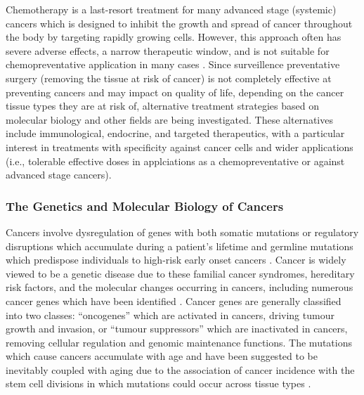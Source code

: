 Chemotherapy is a last-resort treatment for many advanced stage (systemic) cancers which is designed to inhibit the growth and spread of cancer throughout the body by targeting rapidly growing cells. However, this approach often has severe adverse effects, a narrow therapeutic window, and is not suitable for chemopreventative application in many cases \citep{Kaelin2009}. Since surveillence preventative surgery (removing the tissue at risk of cancer) is not completely effective at preventing cancers and may impact on quality of life, depending on the cancer tissue types they are at risk of, alternative treatment strategies based on molecular biology and other fields are being investigated. These alternatives include immunological, endocrine, and targeted therapeutics, with a particular interest in treatments with specificity against cancer cells and wider applications (i.e., tolerable effective doses in applciations as a chemopreventative or against advanced stage cancers).



\subsubsection{The Genetics and Molecular Biology of Cancers}

Cancers involve dysregulation of genes with both somatic mutations or regulatory disruptions which accumulate during a patient's lifetime and germline mutations which predispose individuals to high-risk early onset cancers \citep{NCI2015, ACS2017, Guilford1998}. Cancer is widely viewed to be a genetic disease due to these familial cancer syndromes, hereditary risk factors, and the molecular changes occurring in cancers, including numerous cancer genes which have been identified \citet{Stratton2009, Vogelstein2013}. Cancer genes are generally classified into two classes: ``oncogenes'' which are activated in cancers, driving tumour growth and invasion, or ``tumour suppressors'' which are inactivated in cancers, removing cellular regulation and genomic maintenance functions. The mutations which cause cancers accumulate with age and have been suggested to be inevitably coupled with aging due to the association of cancer incidence with the stem cell divisions in which mutations could occur across tissue types \citep{Tomasetti2015}.  


